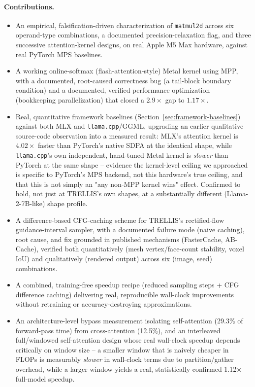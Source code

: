 \documentclass[11pt]{article}
\newcommand{\code}[1]{\texttt{#1}}
\begin{document}
\paragraph{Contributions.}
\begin{itemize}
    \item An empirical, falsification-driven characterization of \code{matmul2d} across six
    operand-type combinations, a documented precision-relaxation flag, and three successive
    attention-kernel designs, on real Apple M5 Max hardware, against real PyTorch MPS baselines.
    \item A working online-softmax (flash-attention-style) Metal kernel using MPP, with a
    documented, root-caused correctness bug (a tail-block boundary condition) and a documented,
    verified performance optimization (bookkeeping parallelization) that closed a $2.9\times$ gap
    to $1.17\times$.
    \item Real, quantitative framework baselines (Section~\ref{sec:framework-baselines}) against
    both MLX and \code{llama.cpp}/GGML, upgrading an earlier qualitative source-code observation
    into a measured result: MLX's attention kernel is $4.02\times$ faster than PyTorch's native
    SDPA at the identical shape, while \code{llama.cpp}'s own independent, hand-tuned Metal kernel
    is \emph{slower} than PyTorch at the same shape -- evidence the kernel-level ceiling we
    approached is specific to PyTorch's MPS backend, not this hardware's true ceiling, and that
    this is not simply an "any non-MPP kernel wins" effect. Confirmed to hold, not just at
    TRELLIS's own shapes, at a substantially different (Llama-2-7B-like) shape profile.
    \item A difference-based CFG-caching scheme for TRELLIS's rectified-flow guidance-interval
    sampler, with a documented failure mode (naive caching), root cause, and fix grounded in
    published mechanisms (FasterCache, AB-Cache), verified both quantitatively (mesh
    vertex/face-count stability, voxel IoU) and qualitatively (rendered output) across six
    (image, seed) combinations.
    \item A combined, training-free speedup recipe (reduced sampling steps + CFG difference
    caching) delivering real, reproducible wall-clock improvements without retraining or
    accuracy-destroying approximations.
    \item An architecture-level bypass measurement isolating self-attention (29.3\% of
    forward-pass time) from cross-attention (12.5\%), and an interleaved full/windowed
    self-attention design whose real wall-clock speedup depends critically on window size --
    a smaller window that is naively cheaper in FLOPs is measurably \emph{slower} in wall-clock
    terms due to partition/gather overhead, while a larger window yields a real, statistically
    confirmed 1.12$\times$ full-model speedup.
\end{itemize}
\end{document}
